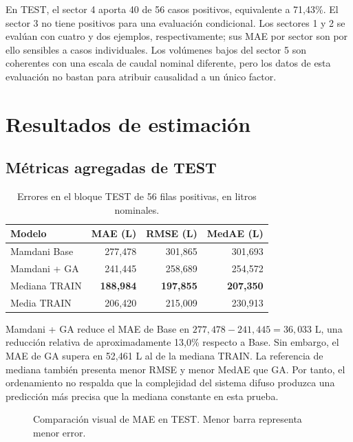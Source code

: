\documentclass[11pt,letterpaper]{article}
\begin{document}
En TEST, el sector 4 aporta 40 de 56 casos positivos, equivalente a 71,43\%. El sector 3 no tiene positivos para una evaluación condicional. Los sectores 1 y 2 se evalúan con cuatro y dos ejemplos, respectivamente; sus MAE por sector son por ello sensibles a casos individuales. Los volúmenes bajos del sector 5 son coherentes con una escala de caudal nominal diferente, pero los datos de esta evaluación no bastan para atribuir causalidad a un único factor.

\section{Resultados de estimación}
\subsection{Métricas agregadas de TEST}
\begin{table}[H]
\centering
\caption{Errores en el bloque TEST de 56 filas positivas, en litros nominales.}\label{tab:metricas-test}
\begin{tabular}{lrrr}
\toprule
Modelo & MAE (L) & RMSE (L) & MedAE (L)\\
\midrule
Mamdani Base & 277,478 & 301,865 & 301,693\\
Mamdani + GA & 241,445 & 258,689 & 254,572\\
Mediana TRAIN & \textbf{188,984} & \textbf{197,855} & \textbf{207,350}\\
Media TRAIN & 206,420 & 215,009 & 230,913\\
\bottomrule
\end{tabular}
\end{table}

Mamdani + GA reduce el MAE de Base en $277{,}478-241{,}445=36{,}033$ L, una reducción relativa de aproximadamente 13,0\% respecto a Base. Sin embargo, el MAE de GA supera en 52,461 L al de la mediana TRAIN. La referencia de mediana también presenta menor RMSE y menor MedAE que GA. Por tanto, el ordenamiento no respalda que la complejidad del sistema difuso produzca una predicción más precisa que la mediana constante en esta prueba.

\begin{figure}[H]
\centering
{}
\caption{Comparación visual de MAE en TEST. Menor barra representa menor error.}\label{fig:mae}
\end{figure}
\end{document}
